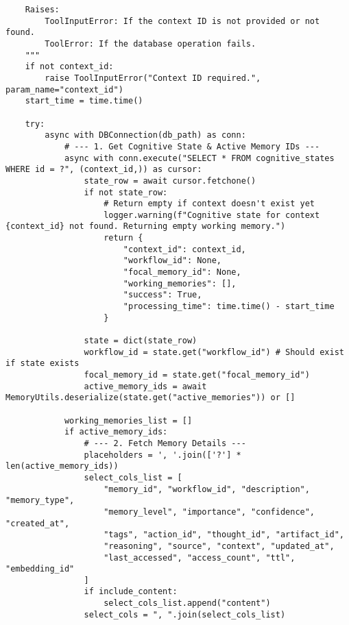 \documentclass[12pt,a4paper]{article}
\begin{document}
\begin{pageablecode}
\begin{verbatim}
    Raises:
        ToolInputError: If the context ID is not provided or not found.
        ToolError: If the database operation fails.
    """
    if not context_id:
        raise ToolInputError("Context ID required.", param_name="context_id")
    start_time = time.time()

    try:
        async with DBConnection(db_path) as conn:
            # --- 1. Get Cognitive State & Active Memory IDs ---
            async with conn.execute("SELECT * FROM cognitive_states WHERE id = ?", (context_id,)) as cursor:
                state_row = await cursor.fetchone()
                if not state_row:
                    # Return empty if context doesn't exist yet
                    logger.warning(f"Cognitive state for context {context_id} not found. Returning empty working memory.")
                    return {
                        "context_id": context_id,
                        "workflow_id": None,
                        "focal_memory_id": None,
                        "working_memories": [],
                        "success": True,
                        "processing_time": time.time() - start_time
                    }

                state = dict(state_row)
                workflow_id = state.get("workflow_id") # Should exist if state exists
                focal_memory_id = state.get("focal_memory_id")
                active_memory_ids = await MemoryUtils.deserialize(state.get("active_memories")) or []

            working_memories_list = []
            if active_memory_ids:
                # --- 2. Fetch Memory Details ---
                placeholders = ', '.join(['?'] * len(active_memory_ids))
                select_cols_list = [
                    "memory_id", "workflow_id", "description", "memory_type",
                    "memory_level", "importance", "confidence", "created_at",
                    "tags", "action_id", "thought_id", "artifact_id",
                    "reasoning", "source", "context", "updated_at",
                    "last_accessed", "access_count", "ttl", "embedding_id"
                ]
                if include_content:
                    select_cols_list.append("content")
                select_cols = ", ".join(select_cols_list)


\end{verbatim}
\end{pageablecode}
\end{document}
